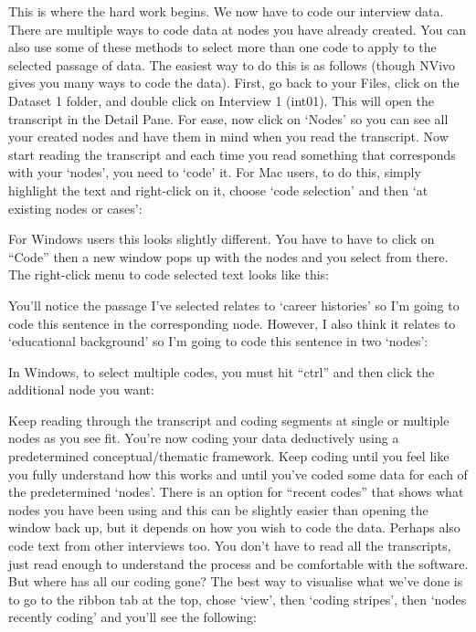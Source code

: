 \documentclass[
]{book}
\begin{document}
This is where the hard work begins. We now have to code our interview data.
There are multiple ways to code data at nodes you have already created. You can also use some of these methods to select more than one code to apply to the selected passage of data.
The easiest way to do this is as follows (though NVivo gives you many ways to code the data). First, go back to your Files, click on the Dataset 1 folder, and double click on Interview 1 (int01). This will open the transcript in the Detail Pane. For ease, now click on `Nodes' so you can see all your created nodes and have them in mind when you read the transcript. Now start reading the transcript and each time you read something that corresponds with your `nodes', you need to `code' it.
For Mac users, to do this, simply highlight the text and right-click on it, choose `code selection' and then `at existing nodes or cases':

For Windows users this looks slightly different. You have to have to click on ``Code'' then a new window pops up with the nodes and you select from there. The right-click menu to code selected text looks like this:

You'll notice the passage I've selected relates to `career histories' so I'm going to code this sentence in the corresponding node. However, I also think it relates to `educational background' so I'm going to code this sentence in two `nodes':

In Windows, to select multiple codes, you must hit ``ctrl'' and then click the additional node you want:

Keep reading through the transcript and coding segments at single or multiple nodes as you see fit. You're now coding your data deductively using a predetermined conceptual/thematic framework.
Keep coding until you feel like you fully understand how this works and until you've coded some data for each of the predetermined `nodes'. There is an option for ``recent codes'' that shows what nodes you have been using and this can be slightly easier than opening the window back up, but it depends on how you wish to code the data. Perhaps also code text from other interviews too. You don't have to read all the transcripts, just read enough to understand the process and be comfortable with the software.
But where has all our coding gone? The best way to visualise what we've done is to go to the ribbon tab at the top, chose `view', then `coding stripes', then `nodes recently coding' and you'll see the following:
\end{document}
